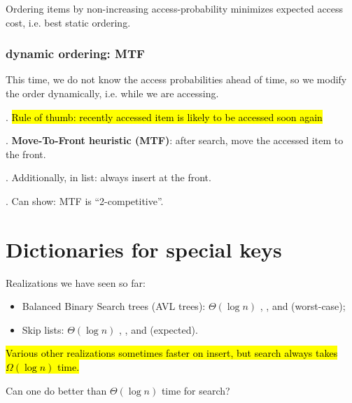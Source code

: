 \documentclass{article}
\begin{document}
\begin{tcolorbox}[colback=yellow!10!white,colframe=orange]
    Ordering items by non-increasing access-probability minimizes expected access cost, i.e. best static ordering. 
\end{tcolorbox}

\subsubsection{dynamic ordering: MTF}

This time, we do not know the access probabilities ahead of time, so we modify the order dynamically, i.e. while we are accessing. 

\begin{comm}[].
    \hl{Rule of thumb: recently accessed item is likely to be accessed soon again} 
\end{comm}

\begin{deff}.
    \textbf{Move-To-Front heuristic (MTF)}: after search, move the accessed  item to the front. 
\end{deff}

\begin{codes}[].
    Additionally, in list: always insert at the front. 
\end{codes}

\begin{thmm}[].
    Can show: MTF is ``2-competitive''. 
\end{thmm}

\newpage

\section{Dictionaries for special keys}

Realizations we have seen so far: \begin{itemize}
    \item Balanced Binary Search trees (AVL trees): $\Theta(\log n)$ , , and  (worst-case); 
    \item Skip lists: $\Theta(\log n)$ , , and  (expected). 
\end{itemize}
\hl{Various other realizations sometimes faster on insert, but search always takes $\Omega(\log n)$ time.} 

\begin{Question}{}
    Can one do better than $\Theta(\log n)$ time for search? 
\end{Question}
\end{document}
